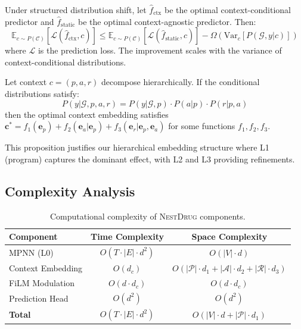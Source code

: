 \documentclass[runningheads]{llncs}
\newcommand{\methodname}{\textsc{NestDrug}}
\begin{document}
\begin{theorem}
\label{thm:benefit}
Under structured distribution shift, let $\hat{f}_{\text{ctx}}$ be the optimal context-conditional predictor and $\hat{f}_{\text{static}}$ be the optimal context-agnostic predictor. Then:
\begin{equation}
    \mathbb{E}_{c \sim P(\mathcal{C})} \left[ \mathcal{L}(\hat{f}_{\text{ctx}}, c) \right] \leq \mathbb{E}_{c \sim P(\mathcal{C})} \left[ \mathcal{L}(\hat{f}_{\text{static}}, c) \right] - \Omega\left( \text{Var}_c[P(\mathcal{G}, y | c)] \right)
\end{equation}
where $\mathcal{L}$ is the prediction loss. The improvement scales with the variance of context-conditional distributions.
\end{theorem}

\begin{proposition}
\label{prop:hierarchy}
Let context $c = (p, a, r)$ decompose hierarchically. If the conditional distributions satisfy:
\begin{equation}
    P(y | \mathcal{G}, p, a, r) = P(y | \mathcal{G}, p) \cdot P(a | p) \cdot P(r | p, a)
\end{equation}
then the optimal context embedding satisfies $\mathbf{c}^* = f_1(\mathbf{e}_p) + f_2(\mathbf{e}_a | \mathbf{e}_p) + f_3(\mathbf{e}_r | \mathbf{e}_p, \mathbf{e}_a)$ for some functions $f_1, f_2, f_3$.
\end{proposition}

This proposition justifies our hierarchical embedding structure where L1 (program) captures the dominant effect, with L2 and L3 providing refinements.

\subsection{Complexity Analysis}

\begin{table}[t]
\caption{Computational complexity of \methodname{} components.}
\label{tab:complexity}
\centering
\small
\begin{tabular}{@{}lcc@{}}
\toprule
Component & Time Complexity & Space Complexity \\
\midrule
MPNN (L0) & $O(T \cdot |E| \cdot d^2)$ & $O(|V| \cdot d)$ \\
Context Embedding & $O(d_c)$ & $O(|\mathcal{P}| \cdot d_1 + |\mathcal{A}| \cdot d_2 + |\mathcal{R}| \cdot d_3)$ \\
FiLM Modulation & $O(d \cdot d_c)$ & $O(d \cdot d_c)$ \\
Prediction Head & $O(d^2)$ & $O(d^2)$ \\
\midrule
\textbf{Total} & $O(T \cdot |E| \cdot d^2)$ & $O(|V| \cdot d + |\mathcal{P}| \cdot d_1)$ \\
\bottomrule
\end{tabular}
\end{table}
\end{document}
